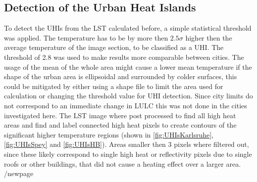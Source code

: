 \documentclass[a4paper, english]{article}
\begin{document}
\subsection{Detection of the Urban Heat Islands}\label{sec:uhiDetection}
To detect the \acp{UHI} from the \ac{LST} calculated before, a simple statistical threshold was applied. 
The temperature has to be by more then $2.5 \sigma$ higher then the average temperature of the image section, to be classified as a \ac{UHI}. 
The threshold of 2.8 was used to make results more comparable between cities. 
The usage of the mean of the whole area might cause a lower mean temperature if the shape of the urban area is ellipsoidal and surrounded by colder surfaces, this could be mitigated by either using a shape file to limit the area used for calculation or changing the threshold value for \ac{UHI} detection. 
Since city limits do not correspond to an immediate change in \ac{LULC} this was not done in the cities investigated here.
%
The \ac{LST} image where post processed to find all high heat areas and find and label connected high heat pixels to create contours of the significant higher temperature regions (shown in \cref{fig:UHIsKarlsruhe},\cref{fig:UHIsSpey} and \cref{fig:UHIsHB}). Areas smaller then 3 pixels where filtered out, since these likely correspond to single high heat or reflectivity pixels due to single roofs or other buildings, that did not cause a heating effect over a larger area.
/newpage
\end{document}
